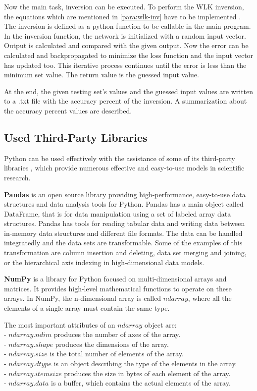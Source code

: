Now the main task, inversion can be executed. To perform the WLK inversion, the equations which are mentioned in \autoref{para:wlk-inv} have to be implemented \cite{nazari1992implementation}. The inversion is defined as a python function to be callable in the main program. In the inversion function, the network is initialized with a random input vector. Output is calculated and compared with the given output. Now the error can be calculated and backpropagated to minimize the loss function and the input vector has updated too. This iterative process continues until the error is less than the minimum set value. The return value is the guessed input value. \smallskip

At the end, the given testing set's values and the guessed input values are written to a .txt file with the accuracy percent of the inversion. A summarization about the accuracy percent values are described.



\subsection{Used Third-Party Libraries}

Python can be used effectively with the assistance of some of its third-party libraries \cite{bressert2012scipy}\cite{chen2017pandas}, which provide numerous effective and easy-to-use models in scientific research. \bigskip

\textbf{Pandas} is an open source library providing high-performance, easy-to-use data structures and data analysis tools for Python. Pandas has a main object called DataFrame, that is for data manipulation using a set of labeled array data structures. Pandas has tools for reading tabular data and writing data between in-memory data structures and different file formats. The data can be handled integratedly and the data sets are transformable. Some of the examples of this transformation are column insertion and deleting, data set merging and joining, or the hierarchical axis indexing in high-dimensional data models.\bigskip

\textbf{NumPy} is a library for Python focused on multi-dimensional arrays and matrices. It provides high-level mathematical functions to operate on these arrays. In NumPy, the n-dimensional array is called $ndarray$, where all the elements of a single array must contain the same type. \medskip

\noindent The most important attributes of an $ndarray$ object are:\\
- $ndarray.ndim$ produces the number of axes of the array.\\
- $ndarray.shape$ produces the dimensions of the array.\\
- $ndarray.size$ is the total number of elements of the array.\\
- $ndarray.dtype$ is an object describing the type of the elements in the array.\\
- $ndarray.itemsize$ produces the size in bytes of each element of the array.\\
- $ndarray.data$ is a buffer, which contains the actual elements of the array.


